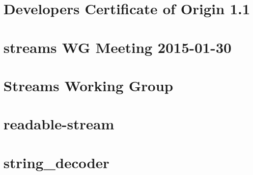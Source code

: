 \documentclass[twoside]{book}
\newcommand{\+}{\discretionary{\mbox{\scriptsize$\hookleftarrow$}}{}{}}
\begin{document}
\chapter{Developer\textquotesingle{}s Certificate of Origin 1.1}
\label{md__c___users_vaishnavi_jadhav__desktop__developer_code_mean_stack_example_client_node_modules_hd28855518f0e3782cfa6e905c65e55d2}

\chapter{streams WG Meeting 2015-\/01-\/30}
\label{md__c___users_vaishnavi_jadhav__desktop__developer_code_mean_stack_example_client_node_modules_h743fc46ba4bd9db250f8070927efdfbb}

\chapter{Streams Working Group}
\label{md__c___users_vaishnavi_jadhav__desktop__developer_code_mean_stack_example_client_node_modules_h34ed523d7e52b4ccf46f6697ef67bf45}

\chapter{readable-\/stream}
\label{md__c___users_vaishnavi_jadhav__desktop__developer_code_mean_stack_example_client_node_modules_h57dea2435e478370f42e251fdc4ab939}

\chapter{string\+\_\+decoder}
\label{md__c___users_vaishnavi_jadhav__desktop__developer_code_mean_stack_example_client_node_modules_h2c7b47b685ffa0ac7c7349473848a918}

\end{document}
